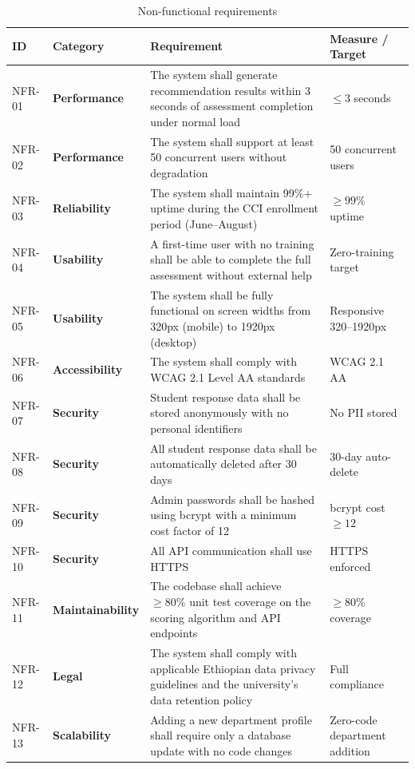 ﻿\documentclass[12pt, a4paper]{article}
\newcommand{\theadrow}{\rowcolor{tableheader}}
\newcommand{\rowalt}{\rowcolor{tablerowalt}}
\begin{document}
\begin{table}[H]
\centering
\begin{tabularx}{\textwidth}{p{1.2cm}p{3cm}Xp{2.5cm}}
\toprule
\theadrow
\textbf{ID} & \textbf{Category} & \textbf{Requirement} & \textbf{Measure / Target} \\
\midrule
NFR-01 & \textbf{Performance}    & The system shall generate recommendation results within 3 seconds of assessment completion under normal load & $\leq 3$ seconds \\[4pt]
\rowalt
NFR-02 & \textbf{Performance}    & The system shall support at least 50 concurrent users without degradation & 50 concurrent users \\[4pt]
NFR-03 & \textbf{Reliability}    & The system shall maintain 99\%+ uptime during the CCI enrollment period (June--August) & $\geq 99\%$ uptime \\[4pt]
\rowalt
NFR-04 & \textbf{Usability}      & A first-time user with no training shall be able to complete the full assessment without external help & Zero-training target \\[4pt]
NFR-05 & \textbf{Usability}      & The system shall be fully functional on screen widths from 320px (mobile) to 1920px (desktop) & Responsive 320--1920px \\[4pt]
\rowalt
NFR-06 & \textbf{Accessibility}  & The system shall comply with WCAG 2.1 Level AA standards & WCAG 2.1 AA \\[4pt]
NFR-07 & \textbf{Security}       & Student response data shall be stored anonymously with no personal identifiers & No PII stored \\[4pt]
\rowalt
NFR-08 & \textbf{Security}       & All student response data shall be automatically deleted after 30 days & 30-day auto-delete \\[4pt]
NFR-09 & \textbf{Security}       & Admin passwords shall be hashed using bcrypt with a minimum cost factor of 12 & bcrypt cost $\geq 12$ \\[4pt]
\rowalt
NFR-10 & \textbf{Security}       & All API communication shall use HTTPS & HTTPS enforced \\[4pt]
NFR-11 & \textbf{Maintainability}& The codebase shall achieve $\geq 80\%$ unit test coverage on the scoring algorithm and API endpoints & $\geq 80\%$ coverage \\[4pt]
\rowalt
NFR-12 & \textbf{Legal}          & The system shall comply with applicable Ethiopian data privacy guidelines and the university's data retention policy & Full compliance \\[4pt]
NFR-13 & \textbf{Scalability}    & Adding a new department profile shall require only a database update with no code changes & Zero-code department addition \\
\bottomrule
\end{tabularx}
\caption{Non-functional requirements}
\end{table}
\end{document}
